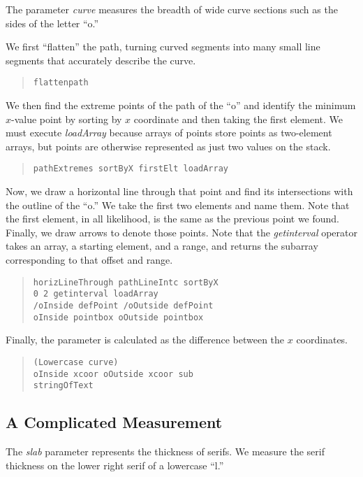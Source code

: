 \documentclass[12pt]{article}
\begin{document}
The parameter \emph{curve} measures the breadth of wide curve sections such as
the sides of the letter ``o.''

We first ``flatten'' the path, turning curved segments into many small line
segments that accurately describe the curve.
\begin{quote}
\begin{verbatim}
flattenpath
\end{verbatim}
\end{quote}
We then find the extreme points of the path of the ``o'' and identify the
minimum $x$-value point by sorting by $x$ coordinate and then taking the first
element. We must execute \emph{loadArray} because arrays of points store points
as two-element arrays, but points are otherwise represented as just two values
on the stack.
\begin{quote}
\begin{verbatim}
pathExtremes sortByX firstElt loadArray
\end{verbatim}
\end{quote}
Now, we draw a horizontal line through that point and find its intersections
with the outline of the ``o.'' We take the first two elements and name them.
Note that the first element, in all likelihood, is the same as the previous
point we found. Finally, we draw arrows to denote those points. Note that the
\emph{getinterval} operator takes an array, a starting element, and a range, and
returns the subarray corresponding to that offset and range.
\begin{quote}
\begin{verbatim}
horizLineThrough pathLineIntc sortByX
0 2 getinterval loadArray
/oInside defPoint /oOutside defPoint
oInside pointbox oOutside pointbox
\end{verbatim}
\end{quote}
Finally, the parameter is calculated as the difference between the $x$
coordinates.
\begin{quote}
\begin{verbatim}
(Lowercase curve)
oInside xcoor oOutside xcoor sub
stringOfText
\end{verbatim}
\end{quote}

\subsection{A Complicated Measurement}

The \emph{slab} parameter represents the thickness of serifs. We measure the
serif thickness on the lower right serif of a lowercase ``l.''
\end{document}
